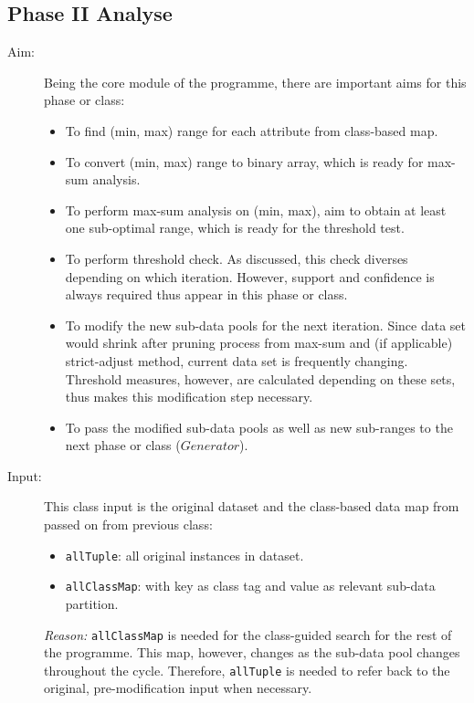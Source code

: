 \subsection{Phase II Analyse}

\begin{description}

\item[Aim: ] Being the core module of the programme, there are important aims for this phase or class:
\begin{itemize}
	\item{To find (min, max) range for each attribute from class-based map.} 
	\item{To convert (min, max) range to binary array, which is ready for max-sum analysis.} 
	\item{To perform max-sum analysis on (min, max), aim to obtain at least one sub-optimal range, which is ready for the threshold test.} 
	\item{To perform threshold check. As discussed, this check diverses depending on which iteration. However, support and confidence is always required thus appear in this phase or class.} 
	\item{To modify the new sub-data pools for the next iteration. Since data set would shrink after pruning process from max-sum and (if applicable) strict-adjust method, current data set is frequently changing. Threshold measures, however, are calculated depending on these sets, thus makes this modification step necessary.} 
	\item{To pass the modified sub-data pools as well as new sub-ranges to the next phase or class ($Generator$).} 
\end{itemize}


\item[Input: ] This class input is the original dataset and the class-based data map from passed on from previous class:
\begin{itemize}
	\item{\texttt{allTuple}:  all original instances in dataset.} 
	\item{\texttt{allClassMap}: with key as class tag and value as relevant sub-data partition.}
\end{itemize}

\textit{Reason: } \texttt{allClassMap} is needed for the class-guided search for the rest of the programme. This map, however, changes as the sub-data pool changes throughout the cycle. Therefore, \texttt{allTuple} is needed to refer back to the original, pre-modification input when necessary.


\end{description}

